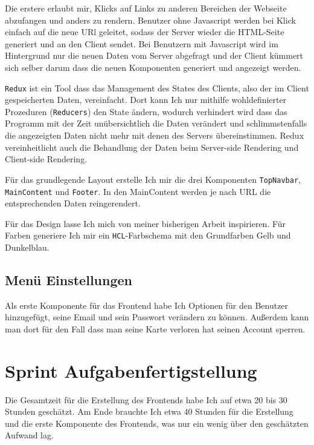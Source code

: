 \documentclass[a4paper,10pt]{scrartcl}
\begin{document}
    Die erstere erlaubt mir, Klicks auf Links zu anderen Bereichen der Webseite
    abzufangen und anders zu rendern.
    Benutzer ohne Javascript werden bei Klick einfach auf die neue URl geleitet,
    sodass der Server wieder die HTML-Seite generiert und an den Client sendet.
    Bei Benutzern mit Javascript wird im Hintergrund nur die neuen Daten vom
    Server abgefragt und der Client kümmert sich selber darum dass die neuen
    Komponenten generiert und angezeigt werden.

    \lstinline{Redux} ist ein Tool dass das Management des States des Clients,
    also der im Client gespeicherten Daten, vereinfacht.
    Dort kann Ich nur mithilfe wohldefinierter Prozeduren (\lstinline{Reducers})
    den State ändern, wodurch verhindert wird dass das Programm mit der Zeit
    unübersichtlich die Daten verändert und schlimmstenfalls die angezeigten
    Daten nicht mehr mit denen des Servers übereinstimmen.
    Redux vereinheitlicht auch die Behandlung der Daten beim Server-side
    Rendering und Client-side Rendering.

    Für das grundlegende Layout erstelle Ich mir die drei Komponenten
    \lstinline{TopNavbar}, \newline \lstinline{MainContent} und
    \lstinline{Footer}.
    In den MainContent werden je nach URL die entsprechenden Daten
    reingerendert.

    Für das Design lasse Ich mich von meiner bisherigen Arbeit inspirieren.
    Für Farben generiere Ich mir ein \lstinline{HCL}-Farbschema mit den
    Grundfarben Gelb und Dunkelblau.

  \subsection{Menü Einstellungen}

    Als erste Komponente für das Frontend habe Ich Optionen für den Benutzer
    hinzugefügt, seine Email und sein Passwort verändern zu können.
    Außerdem kann man dort für den Fall dass man seine Karte verloren hat seinen
    Account sperren.

\section{Sprint Aufgabenfertigstellung}

  Die Gesamtzeit für die Erstellung des Frontends habe Ich auf etwa 20 bis 30
  Stunden geschätzt.
  Am Ende brauchte Ich etwa 40 Stunden für die Erstellung und die erste
  Komponente des Frontends, was nur ein wenig über den geschätzten Aufwand lag.
\end{document}
